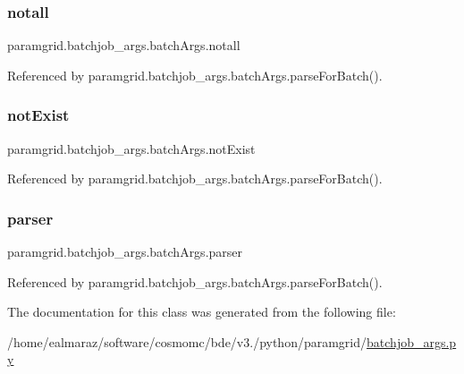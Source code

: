 \subsubsection{\texorpdfstring{notall}{notall}}
{\footnotesize\ttfamily paramgrid.\+batchjob\+\_\+args.\+batch\+Args.\+notall}



Referenced by paramgrid.\+batchjob\+\_\+args.\+batch\+Args.\+parse\+For\+Batch().

\mbox{\label{classparamgrid_1_1batchjob__args_1_1batchArgs_ad2924073b3302cd932a6a446491f7f14}} 
\subsubsection{\texorpdfstring{not\+Exist}{notExist}}
{\footnotesize\ttfamily paramgrid.\+batchjob\+\_\+args.\+batch\+Args.\+not\+Exist}



Referenced by paramgrid.\+batchjob\+\_\+args.\+batch\+Args.\+parse\+For\+Batch().

\mbox{\label{classparamgrid_1_1batchjob__args_1_1batchArgs_a02be3cf93127e121c1f3b54168bb387a}} 
\subsubsection{\texorpdfstring{parser}{parser}}
{\footnotesize\ttfamily paramgrid.\+batchjob\+\_\+args.\+batch\+Args.\+parser}



Referenced by paramgrid.\+batchjob\+\_\+args.\+batch\+Args.\+parse\+For\+Batch().



The documentation for this class was generated from the following file\+:\begin{DoxyCompactItemize}
\item 
/home/ealmaraz/software/cosmomc/bde/v3./python/paramgrid/\mbox{\hyperlink{batchjob__args_8py}{batchjob\+\_\+args.\+py}}\end{DoxyCompactItemize}
